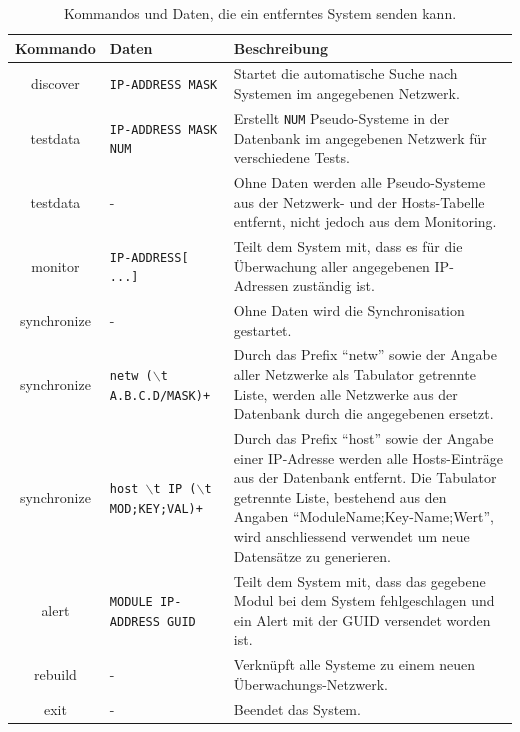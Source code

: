 \begin{table}[H]
\centering
\begin{tabular}{c|l|p{7.3cm}}
 \toprule
 Kommando & Daten & Beschreibung\\
 \midrule
 discover & \texttt{IP-ADDRESS MASK} & Startet die automatische Suche nach Systemen im angegebenen Netzwerk.\\
 \midrule
 testdata & \texttt{IP-ADDRESS MASK NUM} & Erstellt \texttt{NUM} Pseudo-Systeme in der Datenbank im angegebenen Netzwerk f\"ur verschiedene Tests.\\
 \midrule
 testdata & - & Ohne Daten werden alle Pseudo-Systeme aus der Netzwerk- und der Hosts-Tabelle entfernt, nicht jedoch aus dem Monitoring.\\
 \midrule
 monitor & \texttt{IP-ADDRESS[ ...]} & Teilt dem System mit, dass es f\"ur die \"Uberwachung aller angegebenen IP-Adressen zust\"andig ist.\\
 \midrule
 synchronize & - & Ohne Daten wird die Synchronisation gestartet.\\
 \midrule
 synchronize & \texttt{netw ($\backslash$t A.B.C.D/MASK)+} & Durch das Prefix "`netw"' sowie der Angabe aller Netzwerke als Tabulator getrennte Liste, werden alle Netzwerke aus der Datenbank durch die angegebenen ersetzt.\\
 \midrule
 synchronize & \texttt{host $\backslash$t IP ($\backslash$t MOD;KEY;VAL)+} & Durch das Prefix "`host"' sowie der Angabe einer IP-Adresse werden alle Hosts-Eintr\"age aus der Datenbank entfernt. Die Tabulator getrennte Liste, bestehend aus den Angaben "`ModuleName;Key-Name;Wert"', wird anschliessend verwendet um neue Datens\"atze zu generieren.\\
 \midrule
 alert & \texttt{MODULE IP-ADDRESS GUID} & Teilt dem System mit, dass das gegebene Modul bei dem System fehlgeschlagen und ein Alert mit der GUID versendet worden ist.\\
 \midrule
 rebuild & - & Verkn\"upft alle Systeme zu einem neuen \"Uberwachungs-Netzwerk.\\
 \midrule
 exit & - & Beendet das System.\\
 \bottomrule
\end{tabular}
\caption[Kommandos f\"ur entfernte Systeme]{Kommandos und Daten, die ein entferntes System senden kann.}
\label{tbl:praxis-basis-kernel-remote}
\end{table}


